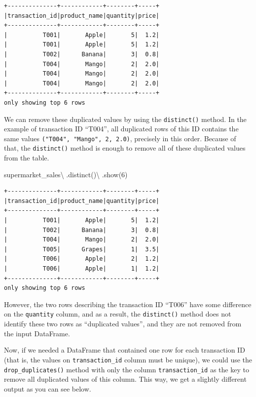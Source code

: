 \documentclass[
  11pt,
  letterpaper,
  DIV=11,
  numbers=noendperiod]{scrreprt}
\newenvironment{Shaded}{\begin{snugshade}}{\end{snugshade}}
\newcommand{\DecValTok}[1]{\textcolor[rgb]{0.68,0.00,0.00}{#1}}
\newcommand{\NormalTok}[1]{\textcolor[rgb]{0.00,0.23,0.31}{#1}}
\newcommand{\OperatorTok}[1]{\textcolor[rgb]{0.37,0.37,0.37}{#1}}
\begin{document}
\begin{verbatim}
+--------------+------------+--------+-----+
|transaction_id|product_name|quantity|price|
+--------------+------------+--------+-----+
|          T001|       Apple|       5|  1.2|
|          T001|       Apple|       5|  1.2|
|          T002|      Banana|       3|  0.8|
|          T004|       Mango|       2|  2.0|
|          T004|       Mango|       2|  2.0|
|          T004|       Mango|       2|  2.0|
+--------------+------------+--------+-----+
only showing top 6 rows
\end{verbatim}

We can remove these duplicated values by using the \texttt{distinct()}
method. In the example of transaction ID ``T004'', all duplicated rows
of this ID contains the same values
\texttt{("T004",\ "Mango",\ 2,\ 2.0)}, precisely in this order. Because
of that, the \texttt{distinct()} method is enough to remove all of these
duplicated values from the table.

\begin{Shaded}
\begin{Highlighting}[]
\NormalTok{supermarket\_sales}\OperatorTok{\textbackslash{}}
\NormalTok{    .distinct()}\OperatorTok{\textbackslash{}}
\NormalTok{    .show(}\DecValTok{6}\NormalTok{)}
\end{Highlighting}
\end{Shaded}

\begin{verbatim}
+--------------+------------+--------+-----+
|transaction_id|product_name|quantity|price|
+--------------+------------+--------+-----+
|          T001|       Apple|       5|  1.2|
|          T002|      Banana|       3|  0.8|
|          T004|       Mango|       2|  2.0|
|          T005|      Grapes|       1|  3.5|
|          T006|       Apple|       2|  1.2|
|          T006|       Apple|       1|  1.2|
+--------------+------------+--------+-----+
only showing top 6 rows
\end{verbatim}

However, the two rows describing the transaction ID ``T006'' have some
difference on the \texttt{quantity} column, and as a result, the
\texttt{distinct()} method does not identify these two rows as
``duplicated values'', and they are not removed from the input
DataFrame.

Now, if we needed a DataFrame that contained one row for each
transaction ID (that is, the values on \texttt{transaction\_id} column
must be unique), we could use the \texttt{drop\_duplicates()} method
with only the column \texttt{transaction\_id} as the key to remove all
duplicated values of this column. This way, we get a slightly different
output as you can see below.
\end{document}

